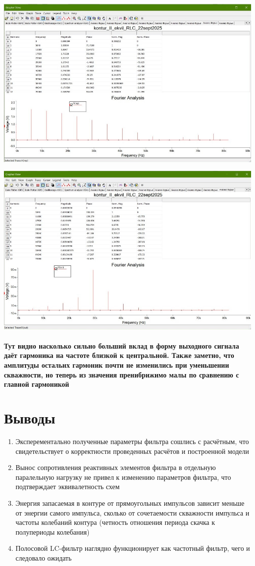 \documentclass[12pt,a4paper]{article}
\begin{document}
	\includegraphics[width=0.7\linewidth]{src/fourier_in_10}
	
	\medskip
	\medskip
	\medskip
	\medskip
	\medskip
	
	\includegraphics[width=0.7\linewidth]{src/fourier_out_10}
	
	
	\paragraph*{Тут видно насколько сильно больший вклад в форму выходного сигнала даёт гармоника на частоте близкой к центральной. Также заметно, что амплитуды остальнх гармоник почти не изменились при уменьшении скважности, но теперь из значения пренибрижимо малы по сравнению с главной гармоникой}
	
	\newpage
	
	\section*{Выводы}
	\begin{enumerate}
		\item Эксперементально полученные параметры фильтра сошлись с расчётным, что свидетельствует о корректности проведенных расчётов и построенной модели
		\item Вынос сопротивления реактивных элементов фильтра в отдельную паралельную нагрузку не привел к изменению параметров фильтра, что подтверждает эквивалетность схем
		\item Энергия запасаемая в контуре от прямоугольных импульсов зависит меньше от энергии самого импульса, сколько от сочетаемости скважности импульса и частоты колебаний контура (четность отношения периода скачка к полупериоды колебания)
		\item Полосовой LC-фильтр наглядно функционирует как частотный фильтр, чего и следовало ожидать
	\end{enumerate}
	
	
\end{document}
